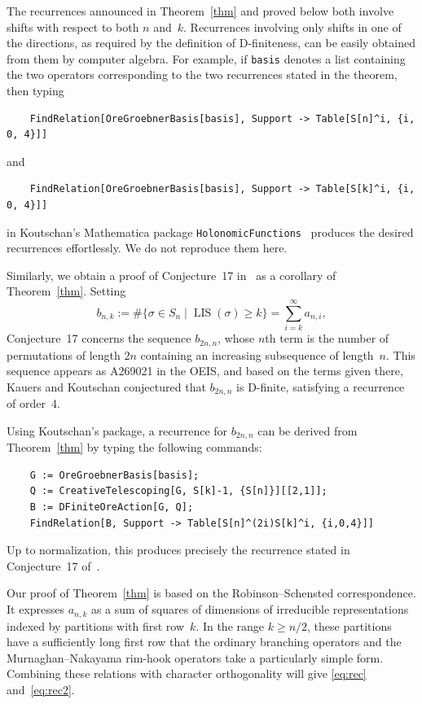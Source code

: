 \documentclass[a4paper,draft]{amsart}
\DeclareMathOperator{\LIS}{LIS}
\begin{document}
The recurrences announced in Theorem~\ref{thm} and proved below both involve shifts with respect
to both $n$ and~$k$. Recurrences involving only shifts in one of the directions, as required by the
definition of D-finiteness, can be easily obtained from them by computer algebra. For example,
if \texttt{basis} denotes a list containing the two operators corresponding to the two recurrences
stated in the theorem, then typing
\begin{verbatim}
    FindRelation[OreGroebnerBasis[basis], Support -> Table[S[n]^i, {i, 0, 4}]]
\end{verbatim}
and
\begin{verbatim}
    FindRelation[OreGroebnerBasis[basis], Support -> Table[S[k]^i, {i, 0, 4}]]
\end{verbatim}
in Koutschan's Mathematica package \texttt{HolonomicFunctions}~\cite{KoutschanHolonomicFunctions}
produces the desired recurrences effortlessly. We do not reproduce them here.

Similarly, we obtain a proof of Conjecture~17 in~\cite{2303.02793} as a corollary of Theorem~\ref{thm}.
Setting
\[
b_{n,k}:=\#\{\sigma\in S_n\mid \LIS(\sigma)\geq k\}=\sum_{i=k}^{\infty}a_{n,i},
\]
Conjecture~17 concerns the sequence $b_{2n,n}$, whose $n$th term is the number of permutations of length $2n$ containing an increasing subsequence of length~$n$.
This sequence appears as A269021 in the OEIS, and based on the terms given there, Kauers and Koutschan
conjectured that $b_{2n,n}$ is D-finite, satisfying a recurrence of order~4.

Using Koutschan's package, a recurrence for $b_{2n,n}$ can be derived from Theorem~\ref{thm} by typing
the following commands:
\begin{verbatim}
    G := OreGroebnerBasis[basis];
    Q := CreativeTelescoping[G, S[k]-1, {S[n]}][[2,1]];
    B := DFiniteOreAction[G, Q];
    FindRelation[B, Support -> Table[S[n]^(2i)S[k]^i, {i,0,4}]]
\end{verbatim}
Up to normalization, this produces precisely the recurrence stated in Conjecture~17 of~\cite{2303.02793}.

Our proof of Theorem~\ref{thm} is based on the Robinson--Schensted
correspondence. It expresses $a_{n,k}$ as a sum of squares of dimensions of
irreducible representations indexed by partitions with first row~$k$. In the
range $k\geq n/2$, these partitions have a sufficiently long first row that the
ordinary branching operators and the Murnaghan--Nakayama rim-hook operators take
a particularly simple form. Combining these relations with character
orthogonality will give \eqref{eq:rec} and~\eqref{eq:rec2}.
\end{document}
